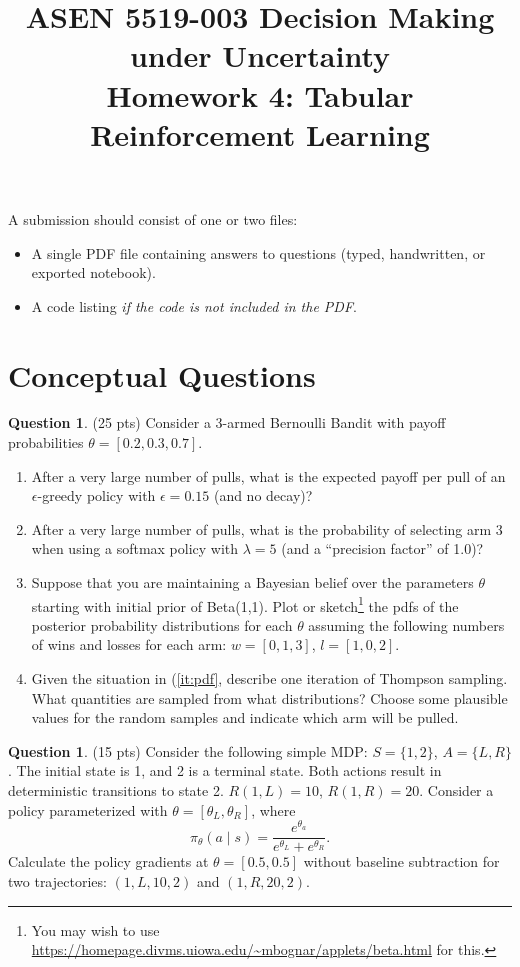 \documentclass{article}
\title{ASEN 5519-003 Decision Making under Uncertainty\\
       Homework 4: Tabular Reinforcement Learning}
\theoremstyle{definition}
\newtheorem{question}[thm]{Question}
\begin{document}
\maketitle

A submission should consist of one or two files:
\begin{itemize}[nosep]
    \item A single PDF file containing answers to questions (typed, handwritten, or exported notebook).
    \item A code listing \emph{if the code is not included in the PDF}.
\end{itemize}

\section{Conceptual Questions}

\begin{question}
    (25 pts) Consider a 3-armed Bernoulli Bandit with payoff probabilities $\theta = [0.2, 0.3, 0.7]$.
    \begin{enumerate}[label=\alph*),noitemsep]
        \item After a very large number of pulls, what is the expected payoff per pull of an $\epsilon$-greedy policy with $\epsilon=0.15$ (and no decay)?
        \item After a very large number of pulls, what is the probability of selecting arm 3 when using a softmax policy with $\lambda=5$ (and a ``precision factor'' of 1.0)?
        \item Suppose that you are maintaining a Bayesian belief over the parameters $\theta$ starting with initial prior of Beta(1,1). Plot or sketch\footnote{You may wish to use \url{https://homepage.divms.uiowa.edu/~mbognar/applets/beta.html} for this.} the pdfs of the posterior probability distributions for each $\theta$ assuming the following numbers of wins and losses for each arm: $w = [0, 1, 3]$, $l = [1, 0, 2]$.\label{it:pdf}
        \item Given the situation in (\ref{it:pdf}, describe one iteration of Thompson sampling. What quantities are sampled from what distributions? Choose some plausible values for the random samples and indicate which arm will be pulled.
    \end{enumerate}
\end{question}

\begin{question}
    (15 pts) Consider the following simple MDP: $S = \{1,2\}$, $A = \{L,R\}$. The initial state is 1, and 2 is a terminal state. Both actions result in deterministic transitions to state 2. $R(1,L) = 10$, $R(1,R) = 20$. Consider a policy parameterized with $\theta = [\theta_L, \theta_R]$, where $$\pi_\theta (a \mid s) = \frac{e^{\theta_a}}{e^{\theta_L} + e^{\theta_R}} \text{.}$$ Calculate the policy gradients at $\theta = [0.5, 0.5]$ without baseline subtraction for two trajectories: $(1,L,10,2)$ and $(1,R,20,2)$.
\end{question}
\end{document}
